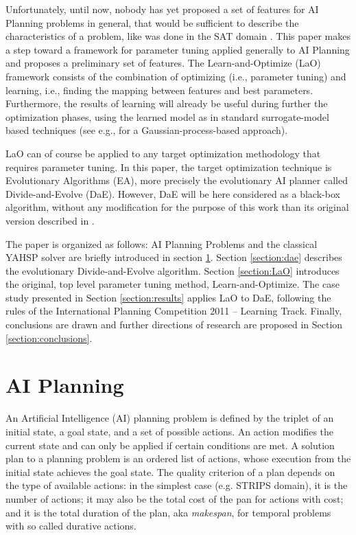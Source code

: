 \documentclass{MYsig-alternate}
\begin{document}
Unfortunately, until now, nobody has yet proposed a set of features for AI Planning problems in general, that would be sufficient to describe the characteristics of a problem, like was done in the SAT domain \cite{Hutter06}. This paper makes a step toward a framework for parameter tuning applied generally to AI Planning and proposes a preliminary set of features. The Learn-and-Optimize (LaO) framework consists of the combination of optimizing (i.e., parameter tuning) and learning, i.e., finding the mapping between features and best parameters. Furthermore, the results of learning will already be useful during further the optimization phases, using the learned model as in standard surrogate-model based techniques (see e.g., \cite{Bardenet} for a Gaussian-process-based approach).

LaO can of course be applied to any target optimization methodology that requires parameter tuning. In this paper, the target optimization technique is Evolutionary Algorithms (EA), more precisely the evolutionary AI planner called Divide-and-Evolve (DaE). However, DaE will be here considered as a black-box algorithm, without any modification for the purpose of this work than its original version described in \cite{BibEvoCop:2010}. 

The paper is organized as follows: AI Planning Problems and the classical YAHSP solver are briefly introduced in section \ref{section:planning}. Section \ref{section:dae} describes the evolutionary  Divide-and-Evolve algorithm. Section \ref{section:LaO} introduces the original, top level parameter tuning method, Learn-and-Optimize. The case study presented in Section \ref{section:results} applies LaO to DaE, following the rules of the International Planning Competition 2011 -- Learning Track. Finally, conclusions are drawn and further directions of research are proposed in Section \ref{section:conclusions}. 

\section{AI Planning}
\label{section:planning}

An Artificial Intelligence (AI) planning problem is defined by the triplet of an initial state, a goal state, and a set of possible actions. An action modifies the current state and can only be applied if certain conditions are met. A solution plan to a planning problem is an ordered list of actions, whose execution from the initial state achieves the goal state. The quality criterion of a plan depends on the type of available actions: in the simplest case (e.g. STRIPS domain), it is the number of actions; it may also be the total cost of the pan for actions with cost; and it is the total duration of the plan, aka {\em makespan}, for temporal problems with so called durative actions.
\end{document}
